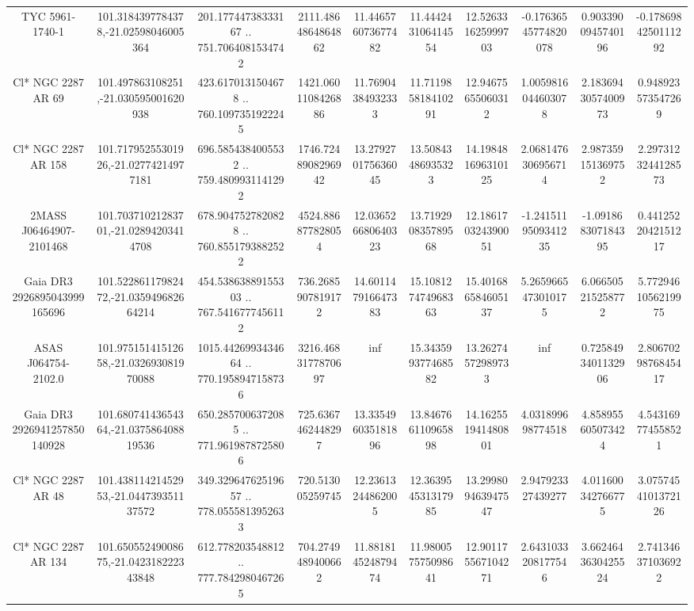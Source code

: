 \begin{table}
\begin{tabular}{cccccccccc}
TYC 5961-1740-1 & 101.3184397784378,-21.02598046005364 & 201.17744738333167 .. 751.7064081534742 & 2111.4864864864862 & 11.446576073677482 & 11.444243106414554 & 12.526331625999703 & -0.17636545774820078 & 0.9033900945740196 & -0.1786984250111292 \\
Cl* NGC 2287     AR      69 & 101.497863108251,-21.030595001620938 & 423.6170131504678 .. 760.1097351922245 & 1421.0601108426886 & 11.76904384932333 & 11.711985818410291 & 12.94675655060312 & 1.0059816044603078 & 2.1836943057400973 & 0.948923573547269 \\
Cl* NGC 2287     AR     158 & 101.71795255301926,-21.02774214977181 & 696.5854384005532 .. 759.4809931141292 & 1746.7248908296942 & 13.279270175636045 & 13.50843486935323 & 14.198481696310125 & 2.0681476306956714 & 2.987359151369752 & 2.2973123244128573 \\
2MASS J06464907-2101468 & 101.70371021283701,-21.02894203414708 & 678.9047527820828 .. 760.8551793882522 & 4524.886877828054 & 12.036526680640323 & 13.719290835789568 & 12.186170324390051 & -1.2415119509341235 & -1.091868307184395 & 0.4412522042151217 \\
Gaia DR3 2926895043999165696 & 101.52286117982472,-21.035949682664214 & 454.53863889155303 .. 767.5416777456112 & 736.2685907819172 & 14.601147916647383 & 15.108127474968363 & 15.401686584605137 & 5.2659665473010175 & 6.066505215258772 & 5.7729461056219975 \\
ASAS J064754-2102.0 & 101.97515141512658,-21.032693081970088 & 1015.4426993434664 .. 770.1958947158736 & 3216.4683177870697 & inf & 15.343599377468582 & 13.26274572989733 & inf & 0.7258493401132906 & 2.8067029876845417 \\
Gaia DR3 2926941257850140928 & 101.68074143654364,-21.037586408819536 & 650.2857006372085 .. 771.9619878725806 & 725.6367462448297 & 13.335496035181896 & 13.846766110965898 & 14.162551941480801 & 4.031899698774518 & 4.858955605073424 & 4.543169774558521 \\
Cl* NGC 2287     AR      48 & 101.43811421452953,-21.044739351137572 & 349.32964762519657 .. 778.0555813952633 & 720.513005259745 & 12.23613244862005 & 12.363954531317985 & 13.299809463947547 & 2.947923327439277 & 4.011600342766775 & 3.0757454101372126 \\
Cl* NGC 2287     AR     134 & 101.65055249008675,-21.042318222343848 & 612.778203548812 .. 777.7842980467265 & 704.2749489400662 & 11.881814524879474 & 11.980057575098641 & 12.901175567104271 & 2.6431033208177546 & 3.6624643630425524 & 2.741346371036922 \\

\end{tabular}
\end{table}
